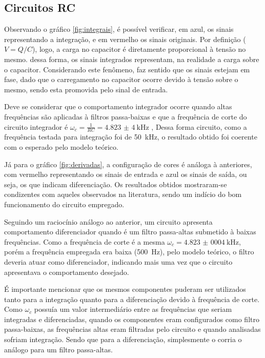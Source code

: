 \subsection{Circuitos RC}

Observando o gráfico \ref{fig:integrais}, é possível verificar, em azul, os sinais representando a integração, e em vermelho os sinais originais. Por definição ($V=Q/C$), logo, a carga no capacitor é diretamente proporcional à tensão no mesmo. dessa forma, os sinais integrados representam, na realidade a carga sobre o capacitor. Considerando este fenômeno, faz sentido que os sinais estejam em fase, dado que o carregamento no capacitor ocorre devido à tensão sobre o mesmo, sendo esta promovida pelo sinal de entrada.

Deve se considerar que o comportamento integrador ocorre quando altas frequências são aplicadas à filtros passa-baixas e que a frequência de corte do circuito integrador é $\omega_c = \frac{1}{R C} = \SI{4,823(4)}{\kilo\hertz}$ \cite{ref:circuitos}, Dessa forma circuito, como a frequência testada para integração foi de \SI{50}{\kilo\hertz}, o resultado obtido foi coerente com o esperado pelo modelo teórico.

Já para o gráfico \ref{fig:derivadas}, a configuração de cores é análoga à anteriores, com vermelho representando os sinais de entrada e azul os sinais de saída, ou seja, os que indicam diferenciação. Os resultados obtidos mostraram-se condizentes com aqueles observados na literatura, sendo um indício do bom funcionamento do circuito empregado.

Seguindo um raciocínio análogo ao anterior, um circuito apresenta comportamento diferenciador quando é um filtro passa-altas submetido à baixas frequências. Como a frequência de corte é a mesma $\omega_c=\SI{4,823(0004)}{\kilo\hertz}$, porém a frequência empregada era baixa (\SI{500}{\hertz}), pelo modelo teórico, o filtro deveria atuar como diferenciador, indicando mais uma vez que o circuito apresentava o comportamento desejado.

É importante mencionar que os mesmos componentes puderam ser utilizados tanto para a integração quanto para a diferenciação devido à frequência de corte. Como $\omega_c$ possuía um valor intermediário entre as frequências que seriam integradas e diferenciadas, quando os componentes eram configurados como filtro passa-baixas, as frequências altas eram filtradas pelo circuito e quando analisadas sofriam integração. Sendo que para a diferenciação, simplesmente o corria o análogo para um filtro passa-altas.

